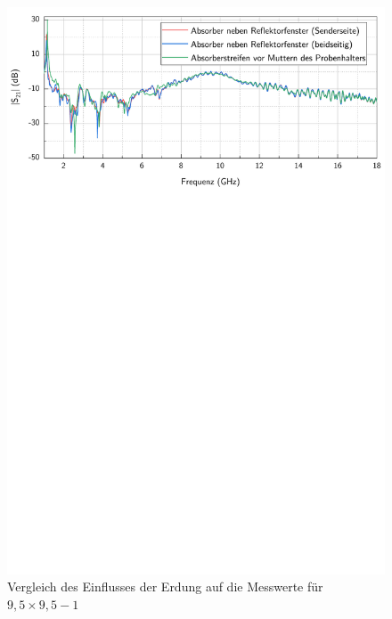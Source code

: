\begin{figure}[H]
    \centering
    \includegraphics[page = 2, width = .99\textwidth, trim = 0cm 16.8cm 0cm 0cm, clip]{Abbildungen/Kapitel4/Messergebnisse/9k5x9k5-1.pdf}
    \caption[Vergleich des Einflusses der Erdung auf die Messwerte]{Vergleich des Einflusses der Erdung auf die Messwerte für \mbox{$9,5\times9,5-1$}}
    \label{fig:4_9k5x9k5-1_Erdung}
\end{figure}

\newpage

